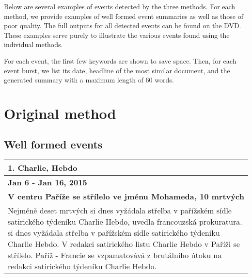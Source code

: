Below are several examples of events detected by the three methods. For each method, we provide examples of well formed event summaries as well as those of poor quality. The full outputs for all detected events can be found on the DVD. These examples serve purely to illustrate the various events found using the individual methods.

For each event, the first few keywords are shown to save space. Then, for each event burst, we list its date, headline of the most similar document, and the generated summary with a maximum length of 60 words.

\section{Original method}
\subsection*{Well formed events}
\begin{tabularx}{\linewidth}{p{\linewidth}} \toprule[1.5pt]

\bf 1. Charlie, Hebdo \\ \midrule
\bf Jan 6 - Jan 16, 2015 \\ \midrule
\bf V centru Paříže se střílelo ve jménu Mohameda, 10 mrtvých \\
Nejméně deset mrtvých si dnes vyžádala střelba v pařížském sídle satirického týdeníku Charlie Hebdo, uvedla francouzská prokuratura. si dnes vyžádala střelba v pařížském sídle satirického týdeníku Charlie Hebdo. V redakci satirického listu Charlie Hebdo v Paříži se střílelo. Paříž - Francie se vzpamatovává z brutálního útoku na redakci satirického týdeníku Charlie Hebdo. \\ \bottomrule[1.25pt]
\end{tabularx}

\hspace{\fill}

